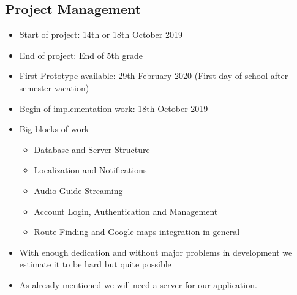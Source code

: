 \documentclass[12pt]{article}
\theoremstyle{definition}
\begin{document}
\subsection{Project Management}
\begin{itemize}
    \item Start of project: 14th or 18th October 2019
    \item End of project: End of 5th grade
    \newline
    \item First Prototype available: 29th February 2020 (First day of school after semester vacation)
    \item Begin of implementation work: 18th October 2019
    \newline
    \newline
    \item Big blocks of work
    \begin{itemize}
        \item Database and Server Structure
        \item Localization and Notifications
        \item Audio Guide Streaming
        \item Account Login, Authentication and Management
        \item Route Finding and Google maps integration in general
    \end{itemize}
    \item With enough dedication and without major problems in development we estimate it to be hard but quite possible
    \item As already mentioned we will need a server for our application.
    
\end{itemize} 
\end{document}
